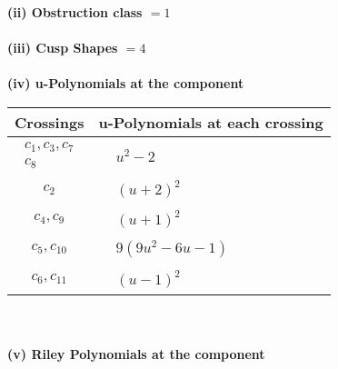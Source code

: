 \documentclass[1p]{elsarticle_modified}
\theoremstyle{definition}
\begin{document}
\flushleft \textbf{(ii) Obstruction class $= 1$}\\~\\
\flushleft \textbf{(iii) Cusp Shapes $= 4$}\\~\\
\newpage\renewcommand{\arraystretch}{1}
\flushleft \textbf{(iv) u-Polynomials at the component}\newline \\
\begin{tabular}{m{50pt}|m{274pt}}
Crossings & \hspace{64pt}u-Polynomials at each crossing \\
\hline $$\begin{aligned}c_{1},c_{3},c_{7}\\c_{8}\end{aligned}$$&$\begin{aligned}
&u^2-2
\end{aligned}$\\
\hline $$\begin{aligned}c_{2}\end{aligned}$$&$\begin{aligned}
&(u+2)^2
\end{aligned}$\\
\hline $$\begin{aligned}c_{4},c_{9}\end{aligned}$$&$\begin{aligned}
&(u+1)^2
\end{aligned}$\\
\hline $$\begin{aligned}c_{5},c_{10}\end{aligned}$$&$\begin{aligned}
&9(9 u^2-6 u-1)
\end{aligned}$\\
\hline $$\begin{aligned}c_{6},c_{11}\end{aligned}$$&$\begin{aligned}
&(u-1)^2
\end{aligned}$\\
\hline
\end{tabular}\\~\\
\newpage\renewcommand{\arraystretch}{1}
\flushleft \textbf{(v) Riley Polynomials at the component}\newline \\
\end{document}
